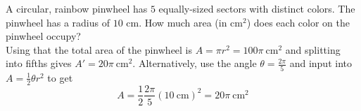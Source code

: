 A circular, rainbow pinwheel has $5$ equally-sized sectors with distinct colors. The pinwheel has a radius of $10$ cm. How much area (in $\text{cm}^2$) does each color on the pinwheel occupy?
\[\]
Using that the total area of the pinwheel is $A = \pi r^2 = 100\pi\ \text{cm}^2$ and splitting into fifths gives $A' = 20\pi\ \text{cm}^2$. Alternatively, use the angle $\theta = \frac{2\pi}{5}$ and input into $A = \frac{1}{2} \theta r^2$ to get
$$
A = \frac{1}{2} \frac{2\pi}{5} (10\ \text{cm})^2 = 20\pi\ \text{cm}^2
$$
